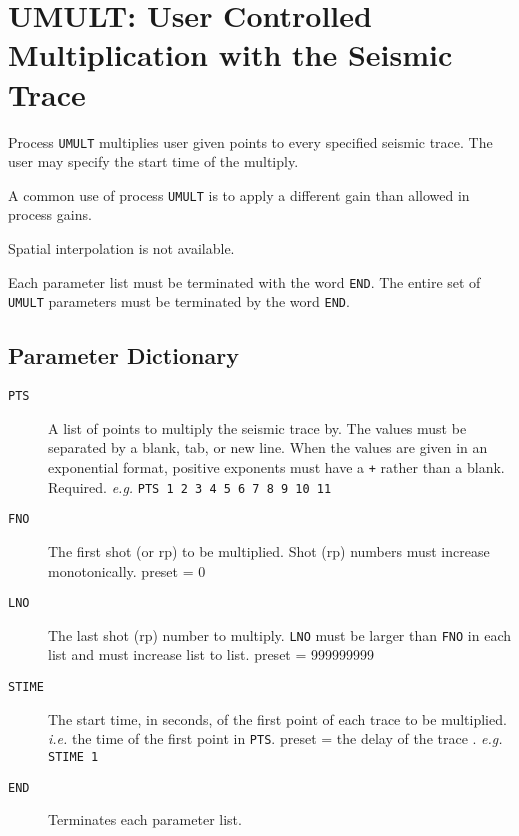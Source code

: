 \section{UMULT: User Controlled Multiplication with the Seismic Trace}
\label{cmd_umult}

Process \texttt{UMULT} multiplies user given points to every specified seismic
trace.  The user may specify the start time of the multiply.

A common use of process \texttt{UMULT} is to apply a different gain than
allowed in process gains.

Spatial interpolation is not available.

Each parameter list must be terminated with the word \texttt{END}.  The entire
set of \texttt{UMULT} parameters must be terminated by the word \texttt{END}.

\subsection{Parameter Dictionary}

\begin{description}
\item[\texttt{PTS}] A list of points to multiply the seismic trace by.  The values
        must be separated by a blank, tab, or new line.  When the
        values are given in an exponential format, positive exponents
        must have a \texttt{+} rather than a blank.
        Required. \textit{e.g.} \texttt{PTS 1 2 3 4 5 6 7 8 9 10 11}

\item[\texttt{FNO}] The first \gls{shot} (or \gls{rp}) to be multiplied.  Shot (\gls{rp}) numbers
        must increase monotonically.
        \Gls{preset} = 0

\item[\texttt{LNO}] The last \gls{shot} (\gls{rp}) number to multiply.  \texttt{LNO} must be larger
        than \texttt{FNO} in each list and must increase list to list.
        \Gls{preset} = 999999999

\item[\texttt{STIME}] The start time, in seconds, of the first point of each trace
        to be multiplied.  \textit{i.e.} the time of the first point in \texttt{PTS}.
        \Gls{preset} = the delay of the trace . \textit{e.g.} \texttt{STIME 1}

\item[\texttt{END}] Terminates each parameter list.
\end{description}

